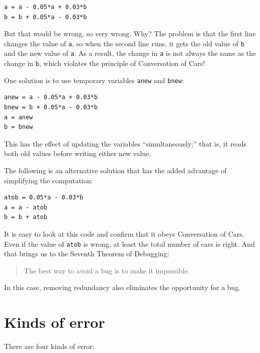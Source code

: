 \documentclass{book}
\begin{document}
\begin{verbatim}
a = a - 0.05*a + 0.03*b
b = b + 0.05*a - 0.03*b
\end{verbatim}

But that would be wrong, so very wrong. Why? The problem is that
the first line changes the value of {\tt a}, so when the second line
runs, it gets the old value of {\tt b} and the new value of {\tt a}.
As a result, the change in {\tt a} is not always the same as the
change in {\tt b}, which violates the principle of Conversation
of Cars!

One solution is to use temporary variables {\tt anew} and {\tt bnew}:

\begin{verbatim}
anew = a - 0.05*a + 0.03*b
bnew = b + 0.05*a - 0.03*b
a = anew
b = bnew
\end{verbatim}

This has the effect of updating the variables ``simultaneously;'' that
is, it reads both old values before writing either new value.

The following is an alternative solution that
has the added advantage of simplifying the computation:

\begin{verbatim}
atob = 0.05*a - 0.03*b
a = a - atob
b = b + atob
\end{verbatim}

It is easy to look at this code and confirm that it obeys Conversation
of Cars. Even if the value of {\tt atob} is wrong, at least the total
number of cars is right. And that brings us to the Seventh Theorem of
Debugging:

\begin{quote}
The best way to avoid a bug is to make it impossible.
\end{quote}

In this case, removing redundancy also eliminates the opportunity for
a bug.


\section{Kinds of error}

There are four kinds of error:
\end{document}
